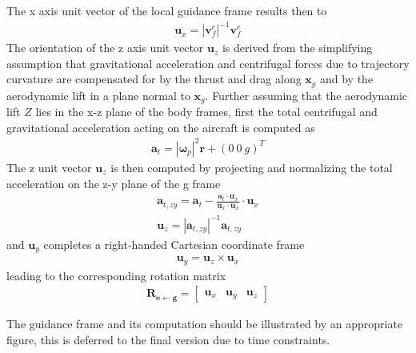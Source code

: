 \documentclass{ifacconf}
\newcommand{\mbf}[1]{\mathbf{#1}}
\providecommand{\mbf}[1]{\mathbf{#1}}
\newcommand{\Reg}{{\ensuremath{\mbf{R_{e\leftarrow  g}}}}}
\begin{document}
The x axis unit vector of the local guidance frame results then to
\begin{align}
\mbf{u}_x = |\mbf{v}_f^e|^{-1}\mbf{v}_f^e
\end{align}
The orientation of the z axis unit vector $\mbf{u}_z$ is derived from the simplifying assumption that gravitational acceleration and centrifugal forces due to trajectory curvature are compensated for by the thrust and drag along $\mbf{x}_g$ and by the aerodynamic lift in a plane normal to $\mbf{x}_g$. Further assuming that the aerodynamic lift $Z$ lies in the x-z plane of the body frames, first the total centrifugal and gravitational acceleration acting on the aircraft is computed as
\begin{align}
\mbf{a}_{t} = |\mbf{\omega}_{p}|^2 \mbf{r} + (0 \: 0 \: g)^T
\end{align}
The z unit vector $\mbf{u}_z$ is then computed by projecting and normalizing the total acceleration on the z-y plane of the g frame
\begin{align}
\mbf{a}_{t,zy} = \mbf{a}_t - \frac{\mbf{a}_t \cdot \mbf{u}_x}{\mbf{u}_x \cdot \mbf{u}_x} \cdot \mbf{u}_x \\
\mbf{u}_z = |\mbf{a}_{t,zy}|^{-1}\mbf{a}_{t,zy}
\end{align}
and $\mbf{u}_y$ completes a right-handed Cartesian coordinate frame
\begin{align}
\mbf{u}_y = \mbf{u}_z \times \mbf{u}_x
\end{align}
leading to the corresponding rotation matrix
\begin{align}
\Reg 
=
\begin{bmatrix}
\mbf{u}_x & 
\mbf{u}_y &
\mbf{u}_z
\end{bmatrix}
\end{align}

The guidance frame and its computation should be illustrated by an appropriate figure, this is deferred to the final version due to time constraints.


\end{document}
